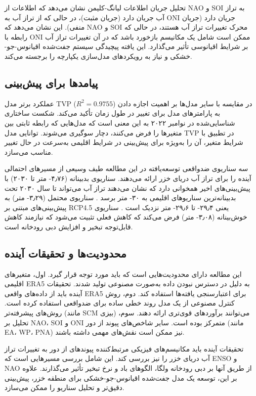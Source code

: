 \documentclass[12pt,a4paper,twocolumn]{article}
\begin{document}
تحلیل جریان اطلاعات لیانگ-کلیمن نشان می‌دهد که اطلاعات از NAO و SOI به تراز آب جریان دارد (جریان مثبت)، در حالی که از تراز آب به ONI جریان دارد (جریان منفی). این نشان می‌دهد که NAO و SOI محرک تغییرات تراز آب هستند، در حالی که رابطه با ONI ممکن است شامل یک مکانیسم بازخورد باشد که در آن تغییرات تراز آب بر شرایط اقیانوسی تأثیر می‌گذارد. این یافته پیچیدگی سیستم جفت‌شده اقیانوس-جو-خشکی و نیاز به رویکردهای مدل‌سازی یکپارچه را برجسته می‌کند.

\subsection{پیامدها برای پیش‌بینی}

عملکرد برتر مدل TVP ($R^2 = 0.9755$) در مقایسه با سایر مدل‌ها بر اهمیت اجازه دادن به پارامترهای مدل برای تغییر در طول زمان تأکید می‌کند. شکست ساختاری شناسایی‌شده در نوامبر ۲۰۲۲ به این معنی است که مدل‌هایی که رابطه ثابتی بین متغیرها را فرض می‌کنند، دچار سوگیری می‌شوند. توانایی مدل TVP در تطبیق با شرایط متغیر، آن را به‌ویژه برای پیش‌بینی در شرایط اقلیمی به‌سرعت در حال تغییر مناسب می‌سازد.

سه سناریوی ضدواقعی توسعه‌یافته در این مطالعه طیف وسیعی از مسیرهای احتمالی آینده را برای تراز آب دریای خزر ارائه می‌دهند. سناریوی بدبینانه (۴٫۷۶- متر تا ۲۰۳۰) با پیش‌بینی‌های اخیر همخوانی دارد که نشان می‌دهند تراز آب می‌تواند تا سال ۲۰۳۰ تحت بدبینانه‌ترین سناریوهای اقلیمی به ۳۰- متر برسد \citep{tengrinews2026, gazeta2026}. سناریوی محتمل (۳٫۲۹- متر) به پیش‌بینی‌های مبتنی بر RCP4.5 یعنی ۲۹٫۴- تا ۲۹٫۶- متر نزدیک است \citep{journal_kazhydromet}. سناریوی خوش‌بینانه (۳٫۰۸- متر) فرض می‌کند که کاهش فعلی تثبیت می‌شود که نیازمند کاهش قابل‌توجه تبخیر و افزایش دبی رودخانه است.

\subsection{محدودیت‌ها و تحقیقات آینده}

این مطالعه دارای محدودیت‌هایی است که باید مورد توجه قرار گیرد. اول، متغیرهای اقلیمی ERA5 به دلیل در دسترس نبودن داده به‌صورت مصنوعی تولید شدند. تحقیقات آینده باید از داده‌های واقعی ERA5 برای اعتبارسنجی یافته‌ها استفاده کند. دوم، روش کنترل مصنوعی از یک مدل روند خطی ساده برای ضدواقعی استفاده کرده است. روش‌های پیشرفته‌تر (مانند SCM بیزی) می‌توانند برآوردهای قوی‌تری ارائه دهند. سوم، تحلیل بر NAO، SOI و ONI متمرکز بوده است. سایر شاخص‌های پیوند از دور (مانند EA، WP، PNA) نیز ممکن است نقش‌های مهمی داشته باشند.

تحقیقات آینده باید مکانیسم‌های فیزیکی مرتبط‌کننده پیوندهای از دور به تغییرات تراز آب دریای خزر را نیز بررسی کند. این شامل بررسی مسیرهایی است که ENSO و NAO از طریق آنها بر دبی رودخانه ولگا، الگوهای باد و نرخ تبخیر تأثیر می‌گذارند. علاوه بر این، توسعه یک مدل جفت‌شده اقیانوس-جو-خشکی برای منطقه خزر، پیش‌بینی دقیق‌تر و تحلیل سناریو را ممکن می‌سازد.
\end{document}
